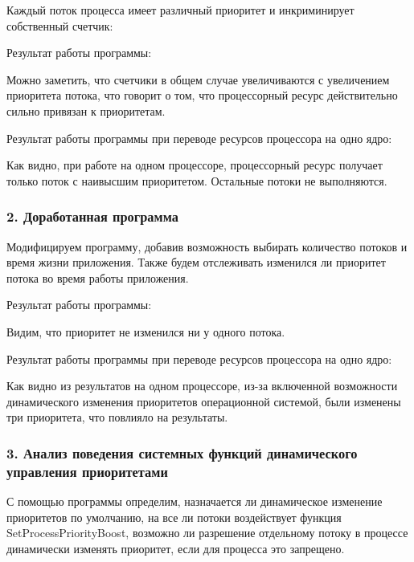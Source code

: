 \documentclass[14pt,a4paper,report]{report}
\begin{document}
Каждый поток процесса имеет различный приоритет и инкриминирует собственный счетчик:



Результат работы программы:



Можно заметить, что счетчики в общем случае увеличиваются с увеличением приоритета потока, что говорит о том, что процессорный ресурс действительно сильно привязан к приоритетам.

Результат работы программы при переводе ресурсов процессора на одно ядро:



Как видно, при работе на одном процессоре, процессорный ресурс получает только поток с наивысшим приоритетом. Остальные потоки не выполняются.

\subsubsection{2. Доработанная программа}

Модифицируем программу, добавив возможность выбирать количество потоков и время жизни приложения. Также будем отслеживать изменился ли приоритет потока во время работы приложения.



Результат работы программы:



Видим, что приоритет не изменился ни у одного потока.

Результат работы программы при переводе ресурсов процессора на одно ядро:



Как видно из результатов на одном процессоре, из-за включенной возможности динамического изменения приоритетов операционной системой, были изменены три приоритета, что повлияло на результаты.

\subsubsection{3. Анализ поведения системных функций динамического управления приоритетами }

С помощью программы определим, назначается ли динамическое изменение приоритетов по умолчанию, на все ли потоки воздействует функция SetProcessPriorityBoost, возможно ли разрешение отдельному потоку в процессе динамически изменять приоритет, если для процесса это запрещено.
\end{document}
